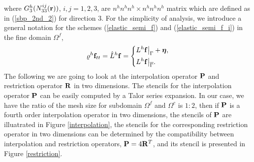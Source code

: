 where ${G}_3^{h}(N_{33}^{ij}({\bf r}))$, $i,j = 1,2,3$, are $n^{h}n^{h}n^{h}\times n^{h}n^{h}n^{h}$ matrix which are defined as in (\ref{sbp_2nd_2}) for direction $3$. For the simplicity of analysis, we introduce a general notation for the schemes (\ref{elastic_semi_f}) and (\ref{elastic_semi_f_i}) in the fine domain $\Omega^f$,
\begin{align}\label{fine_scheme}
{\varrho}^h{\bf f}_{tt} = \hat{L}^h{\bf f} = \left\{
\begin{aligned}
&L^h{\bf f}\big|_\Gamma +{\bm \eta}, \\
&L^h{\bf f}\big|_{\overline{\Gamma}}.
\end{aligned}
\right.
\end{align}
The following we are going to look at the interpolation operator ${\bf P}$ and restriction operator ${\bf R}$ in two dimensions. The stencils for the interpolation operator ${\bf P}$ can be easily computed by a Talor series expansion. In our case, we have the ratio of the mesh size for subdomain $\Omega^f$ and $\Omega^c$ is $1:2$, then if  ${\bf P}$ is a fourth order interpolation operator in two dimensions,  the stencils of ${\bf P}$ are illuatrated in  Figure \ref{interpolation}, the stencils for the corresponding restriction operator in two dimensions can be determined by the compatibility between interpolation and restriction operators, ${\bf P} = 4{\bf R}^T$, and its stencil is presented in Figure \ref{restriction}.
